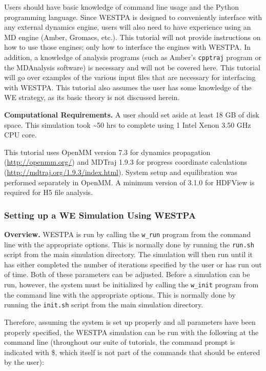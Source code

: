 Users should have basic knowledge of command line usage and the Python programming language. 
Since WESTPA is designed to conveniently interface with any external dynamics engine, users will also need to have experience using an MD engine (Amber, Gromacs, etc.). 
This tutorial will not provide instructions on how to use those engines; only how to interface the engines with WESTPA. 
In addition, a knowledge of analysis programs (such as Amber’s \verb|cpptraj| program or the MDAnalysis software) is necessary and will not be covered here. 
This tutorial will go over examples of the various input files that are necessary for interfacing with WESTPA. 
This tutorial also assumes the user has some knowledge of the WE strategy, as its basic theory is not discussed herein.

\textbf{Computational Requirements.} A user should set aside at least 18 GB of disk space. 
This simulation took \textasciitilde 50 hrs to complete using 1 Intel Xenon 3.50 GHz CPU core.

This tutorial uses OpenMM version 7.3 for dynamics propagation (\url{http://openmm.org/}) and MDTraj 1.9.3 for progress coordinate calculations (\url{http://mdtraj.org/1.9.3/index.html}). System setup and equilibration was performed separately in OpenMM. A minimum version of 3.1.0 for HDFView is required for H5 file analysis.

\subsubsection{Setting up a WE Simulation Using WESTPA}
\label{tut:basic-nacl-3}
\textbf{Overview.} WESTPA is run by calling the \verb|w_run| program from the command line with the appropriate options. 
This is normally done by running the \verb|run.sh| script from the main simulation directory. 
The simulation will then run until it has either completed the number of iterations specified by the user or has run out of time. 
Both of these parameters can be adjusted. 
Before a simulation can be run, however, the system must be initialized by calling the \verb|w_init| program from the command line with the appropriate options. 
This is normally done by running the \verb|init.sh| script from the main simulation directory.

Therefore, assuming the system is set up properly and all parameters have been properly specified, the WESTPA simulation can be run with the following at the command line (throughout our suite of tutorials, the command prompt is indicated with \$, which itself is not part of the commands that should be entered by the user):

